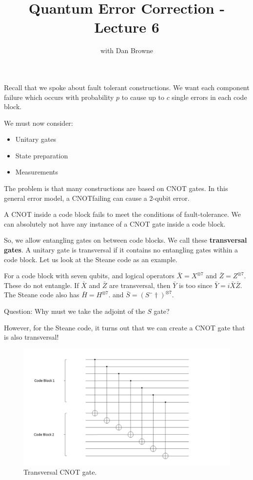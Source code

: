 


\title{Quantum Error Correction - Lecture 6}
\author{with Dan Browne}
\maketitle
\tableofcontents




Recall that we spoke about fault tolerant constructions. We want each component failure which occurs with probability $p$ to cause up to $c$ single errors in each code block. 

We must now consider:
\begin{itemize}
\item Unitary gates
\item State preparation
\item Measurements
\end{itemize}
The problem is that many constructions are based on CNOT gates. In this general error model, a CNOTfailing can cause a 2-qubit error. 

A CNOT inside a code block fails to meet the conditions of fault-tolerance. We can absolutely not have any instance of a CNOT gate inside a code block. 

So, we allow entangling gates on between code blocks. We call these \textbf{transversal gates}. A unitary gate is transversal if it contains no entangling gates within a code block. Let us look at the Steane code as an example. 

For a code block with seven qubits, and logical operators $\bar{X} = X^{\otimes7}$ and $\bar{Z} = Z^{\otimes 7}$. These do not entangle. If $\bar{X}$ and $\bar{Z}$ are transversal, then  $\bar{Y}$ is too since $\bar{Y} = i \bar{X} \bar{Z}$. The Steane code also has $\bar{H} = H^{\otimes 7}$. and $\bar{S} = (S¨\dagger)^{\otimes 7}$. 

Question: Why must we take the adjoint of the $S$ gate? 

However, for the Steane code, it turns out that we can create  a CNOT gate that is also transversal! 

\begin{figure}[h]
\centering
\includegraphics[width = \textwidth ]{./Transversal_CNOT.jpg}
\caption{Transversal CNOT gate.}
\end{figure}

